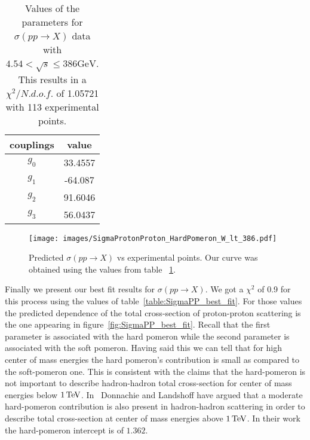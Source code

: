 \documentclass[preprint, 12pt]{elsarticle}
\begin{document}
\begin{table}[b!]
\centering
\caption{Values of the parameters for $\sigma\left(p p \rightarrow X\right)$ data with $4.54 < \sqrt{s} \leq 386 \text{GeV}$. This results in a $\chi^2 / {N.d.o.f.}$ of 1.05721 with 113 experimental points.}
\vspace{0.5cm}
\begin{tabular}{|c|c|}
\hline
couplings   & value \\
\hline
$g_0$  & 33.4557\\ 
\hline
$g_1$  & -64.087 \\ 
\hline
$g_2$  & 91.6046  \\
\hline
$g_3$  & 56.0437\\ 
\hline
\end{tabular}
\label{table:SigmaPP_best_fit_W_lt_386}
\end{table}

\begin{figure}[!h]
\center
\texttt{[image: images/SigmaProtonProton\_HardPomeron\_W\_lt\_386.pdf]} 
\caption{Predicted $\sigma\left(p p \rightarrow X\right)$ vs experimental points. Our curve was obtained using the values from table ~\ref{table:SigmaPP_best_fit_W_lt_386}.}
\label{fig:SigmaPP_best_fit_W_lt_386}
\end{figure}

Finally we present our best fit results for $\sigma\left(p p \rightarrow X\right)$. We got a $\chi^2$ of 0.9 for this process using the values of table~\ref{table:SigmaPP_best_fit}. For those values the predicted dependence of the total cross-section of proton-proton scattering is the one appearing in figure~\ref{fig:SigmaPP_best_fit}. Recall that the first parameter is associated with the hard pomeron while the second parameter is associated with the soft pomeron. Having said this we can tell that for high center of mass energies the hard pomeron's contribution is small as compared to the soft-pomeron one. This is consistent with the claims that the hard-pomeron is not important to describe hadron-hadron total cross-section for center of mass energies below $1 {\rm \, TeV}$. In~\cite{Donnachie:2011aa} Donnachie and Landshoff have argued that a moderate hard-pomeron contribution is also present in hadron-hadron scattering in order to describe total cross-section at center of mass energies above $1 {\rm \, TeV}$. In their work the hard-pomeron intercept is of $1.362$.
\end{document}
